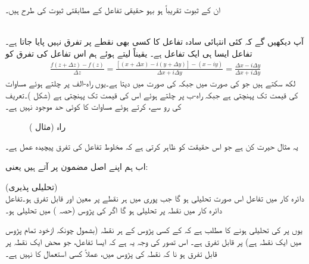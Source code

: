 ان کے ثبوت تقریباً ہو بہو حقیقی تفاعل کے مطابقتی ثبوت کی طرح ہیں۔

\quad {}\\
آپ دیکھیں گے کہ کئی انتہائی سادہ تفاعل کا کسی بھی نقطے پر تفرق نہیں پایا جاتا ہے۔تفاعل  ایسا ہی ایک تفاعل ہے۔ یقیناً  لیتے ہوئے ہم اس تفاعل کی تفرق کو
\begin{align}\label{مساوات_مخلوط_نا_قابل_تفرق}
\frac{f(z+\Delta z)-f(z)}{\Delta z}=\frac{[(x+\Delta x)-i(y+\Delta y)]-(x-iy)}{\Delta x+i\Delta y}=\frac{\Delta x-i\Delta y}{\Delta x+i\Delta y}
\end{align}
لکھ سکتے ہیں جو  کی صورت میں  جبکہ  کی صورت میں  دیتا ہے۔یوں  راہ-الف پر چلتے ہوئے مساوات  کی قیمت  تک پہنچتی ہے جبکہ راہ-ب پر چلتے ہوئے اس کی قیمت  تک پہنچتی ہے (شکل )۔تعریف کی رو سے،   کرتے ہوئے  مساوات  کا کوئی حد موجود نہیں ہے۔
\begin{figure}
\centering
{}
\caption{راہ (مثال )}
\label{شکل_مثال_مخلوط_نا_قابل_تفرق}
\end{figure}
یہ مثال حیرت کن ہے جو اس حقیقت کو ظاہر کرتی ہے کہ مخلوط تفاعل کی تفرق پیچیدہ عمل ہے۔

اب ہم اپنے اصل مضمون پر آتے ہیں یعنی:

\quad (تحلیلی پذیری)\\
دائرہ کار  میں تفاعل  اس صورت تحلیلی ہو گا جب پوری  میں ہر نقطے پر  معین اور قابل تفرق ہو۔تفاعل  دائرہ کار  میں نقطہ  پر تحلیلی ہو گا اگر  کی پڑوس (حصہ ) میں  تحلیلی ہو۔

یوں  پر  کی تحلیلی ہونے کا مطلب ہے کہ  کے کسی پڑوس کے ہر نقطہ (بشمول  چونکہ  ازخود تمام پڑوس میں ایک نقطہ ہے) پر  قابل تفرق ہے۔ اس تصور کی وجہ یہ ہے کہ ایسا تفاعل، جو محض  ایک نقطہ پر قابل تفرق ہو نا کہ نقطہ کی پڑوس میں، عملاً  کسی استعمال کا نہیں ہے۔
 
